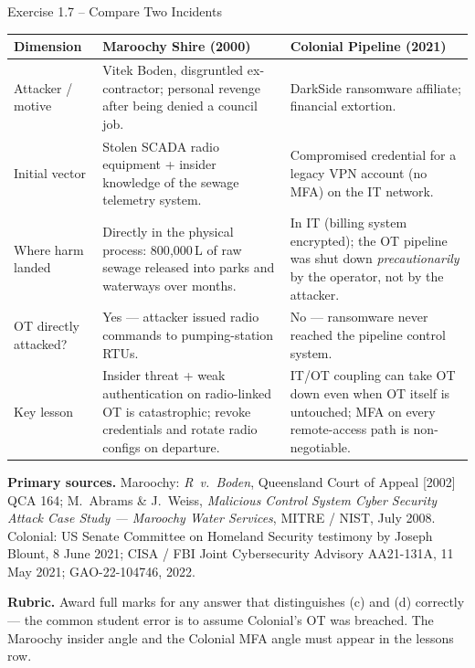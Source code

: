 \documentclass[11pt,a4paper]{article}
\begin{document}
\begin{solutionbox}{Exercise 1.7 -- Compare Two Incidents}
\begin{center}
\begin{tabular}{p{2.6cm} p{5.2cm} p{5.2cm}}
\toprule
\textbf{Dimension} & \textbf{Maroochy Shire (2000)} & \textbf{Colonial Pipeline (2021)} \\
\midrule
Attacker / motive & Vitek Boden, disgruntled ex-contractor; personal revenge after being denied a council job. & DarkSide ransomware affiliate; financial extortion. \\
Initial vector & Stolen SCADA radio equipment + insider knowledge of the sewage telemetry system. & Compromised credential for a legacy VPN account (no MFA) on the IT network. \\
Where harm landed & Directly in the physical process: 800{,}000\,L of raw sewage released into parks and waterways over months. & In IT (billing system encrypted); the OT pipeline was shut down \emph{precautionarily} by the operator, not by the attacker. \\
OT directly attacked? & Yes --- attacker issued radio commands to pumping-station RTUs. & No --- ransomware never reached the pipeline control system. \\
Key lesson & Insider threat + weak authentication on radio-linked OT is catastrophic; revoke credentials and rotate radio configs on departure. & IT/OT coupling can take OT down even when OT itself is untouched; MFA on every remote-access path is non-negotiable. \\
\bottomrule
\end{tabular}
\end{center}
\textbf{Primary sources.} Maroochy: \emph{R~v.\ Boden}, Queensland Court of Appeal [2002] QCA 164; M.\ Abrams \& J.\ Weiss, \emph{Malicious Control System Cyber Security Attack Case Study --- Maroochy Water Services}, MITRE / NIST, July 2008. Colonial: US Senate Committee on Homeland Security testimony by Joseph Blount, 8 June 2021; CISA / FBI Joint Cybersecurity Advisory AA21-131A, 11 May 2021; GAO-22-104746, 2022.

\textbf{Rubric.} Award full marks for any answer that distinguishes (c) and (d) correctly --- the common student error is to assume Colonial's OT was breached. The Maroochy insider angle and the Colonial MFA angle must appear in the lessons row.
\end{solutionbox}
\end{document}
